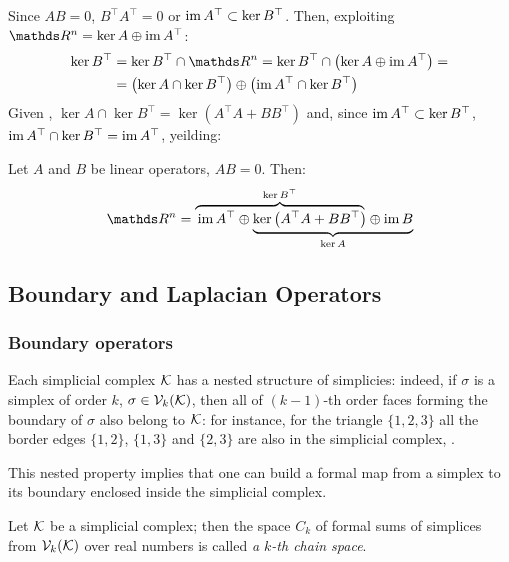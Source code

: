 Since \( A B = 0\), \( B^\top A^\top = 0 \) or \( \operatorname{im} A^\top \subset \ker B^\top \). Then, exploiting \( \ds R^n = \ker A \oplus \im A^\top \): 
\begin{equation}
      \begin{aligned}
            \ker B^\top & = \ker B^\top \cap \ds R^n = \ker B^\top \cap \left( \ker A \oplus \im A^\top \right) = \\
            & = \left( \ker A \cap \ker B^\top \right) \oplus \left( \im A^\top \cap \ker B^\top \right)
      \end{aligned}
\end{equation}
Given , \( \ker A \cap \ker B^\top = \ker \left(  A^\top A + B B^\top \right) \) and, since \( \operatorname{im} A^\top \subset \ker B^\top \), \( \operatorname{im} A^\top \cap \ker B^\top = \operatorname{im} A^\top \), yeilding:
\begin{theorem}\label{thm:hodge_decomposition}
      Let \( A \) and \( B \) be linear operators, \( A B = 0 \). Then:
      \begin{equation}
            \ds R^n = \lefteqn{\overbrace{\phantom{\im A^\top \oplus  \ker \left( A^\top A + B B^\top \right)}}^{\ker B^\top}} \im A^\top \oplus
            \underbrace{\ker \left( A^\top A + B B^\top \right) \oplus  \im B}_{\ker A}
      \end{equation}
      \vspace{-\baselineskip}
\end{theorem}





\subsection{ Boundary and Laplacian Operators }

\subsubsection{Boundary operators}

Each simplicial complex \( \mathcal{K} \) has a nested structure of simplicies: indeed, if \( \sigma \) is a simplex of order \( k \), \( \sigma \in \mathcal{V}_{k}(\mathcal{K}) \), then all of \( (k-1)\)-th order faces forming the boundary of \( \sigma \) also belong to \( \mathcal{K} \): for instance, for the triangle \( \{ 1, 2, 3  \} \) all the border edges \( \{ 1, 2\} \), \( \{ 1, 3\}\) and \( \{ 2, 3 \}\) are also in the simplicial complex, . 

This nested property implies that one can build a formal map from a simplex to its boundary enclosed inside the simplicial complex. 

\begin{definition}
      Let \( \mathcal{K} \) be a simplicial complex; then the space \( C_k \) of formal sums of simplices from \( \mathcal{V}_{k}(\mathcal{K}) \) over real numbers is called \emph{a \( k\)-th chain space}.
\end{definition}

